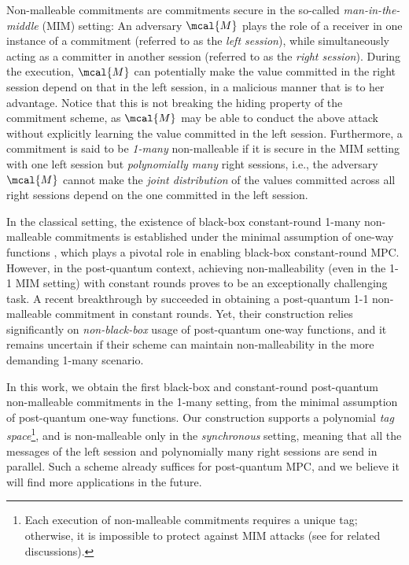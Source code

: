  Non-malleable commitments \cite{STOC:DolDwoNao91} are commitments secure in the so-called {\em man-in-the-middle} (MIM) setting: An adversary $\mcal{M}$ plays the role of a receiver in one instance of a commitment (referred to as the {\em left session}), while simultaneously acting as a committer in another session (referred to as the {\em right session}). During the execution, $\mcal{M}$ can potentially make the value committed in the right session depend on that in the left session, in a malicious manner that is to her advantage. Notice that this is not breaking the hiding property of the commitment scheme, as $\mcal{M}$ may be able to conduct the above attack without explicitly learning the value committed in the left session. Furthermore, a commitment is said to be {\em 1-many} non-malleable if it is secure in the MIM setting with one left session but {\em polynomially many} right sessions, i.e., the adversary $\mcal{M}$ cannot make the {\em joint distribution} of the values committed across all right sessions depend on the one committed in the left session.


In the classical setting, the existence of black-box constant-round 1-many non-malleable commitments is established under the minimal assumption of one-way functions \cite{STOC:Goyal11,FOCS:GLOV12}, which plays a pivotal role in enabling black-box constant-round MPC. However, in the post-quantum context, achieving non-malleability (even in the 1-1 MIM setting) with constant rounds proves to be an exceptionally challenging task. A recent breakthrough by \cite{FOCS:LPY23} succeeded in obtaining a post-quantum 1-1 non-malleable commitment in constant rounds. Yet, their construction relies significantly on {\em non-black-box} usage of post-quantum one-way functions, and it remains uncertain if their scheme can maintain non-malleability in the more demanding 1-many scenario.


In this work, we obtain the first black-box and constant-round post-quantum non-malleable commitments in the 1-many setting, from the minimal assumption of post-quantum one-way functions. Our construction supports a polynomial {\em tag space}\footnote{Each execution of non-malleable commitments requires a unique tag; otherwise, it is impossible to protect against MIM attacks (see \cite{STOC:Pass04} for related discussions).}, and is non-malleable only in the {\em synchronous} setting, meaning that all the messages of the left session and polynomially many right sessions are send in parallel. Such a scheme already suffices for post-quantum MPC, and we believe it will find more applications in the future.

